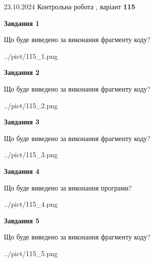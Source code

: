 \documentclass[12pt, ukrainian]{article}
\begin{document}
{\Large{23.10.2024 Контрольна робота , варіант  \No \textbf { 115 }\par}}
{
\begin {large}
{\begin {center}\textbf{Завдання 1}\end {center}}

Що буде виведено за виконання фрагменту коду?\par
\begin{center}
	{../pict/115_1.png}
\end{center}
\newpage

{\begin {center}\textbf{Завдання 2}\end {center}}

Що буде виведено за виконання фрагменту коду?\par
\begin{center}
	{../pict/115_2.png}
\end{center}
\newpage

{\begin {center}\textbf{Завдання 3}\end {center}}

Що буде виведено за виконання фрагменту коду?\par
\begin{center}
	{../pict/115_3.png}
\end{center}
\newpage

{\begin {center}\textbf{Завдання 4}\end {center}}

Що буде виведено за виконання програми?\par
\begin{center}
	{../pict/115_4.png}
\end{center}
\newpage

{\begin {center}\textbf{Завдання 5}\end {center}}

Що буде виведено за виконання фрагменту коду?\par
\begin{center}
	{../pict/115_5.png}
\end{center}
\newpage


\end{large}}
\end{document}
